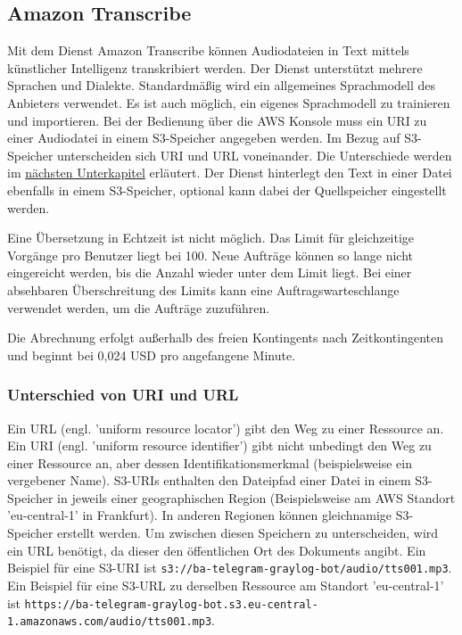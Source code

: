 \subsection{Amazon Transcribe}
\label{sec:amazon-transcribe}

Mit dem Dienst Amazon Transcribe können Audiodateien in Text mittels künstlicher Intelligenz transkribiert werden. Der Dienst unterstützt mehrere Sprachen und Dialekte. Standardmäßig wird ein allgemeines Sprachmodell des Anbieters verwendet. Es ist auch möglich, ein eigenes Sprachmodell zu trainieren und importieren. Bei der Bedienung über die AWS Konsole muss ein URI zu einer Audiodatei in einem S3-Speicher angegeben werden. Im Bezug auf S3-Speicher unterscheiden sich URI und URL voneinander. Die Unterschiede werden im \hyperref[sec:unterschied-uri-url]{nächsten Unterkapitel} erläutert. Der Dienst hinterlegt den Text in einer Datei ebenfalls in einem S3-Speicher, optional kann dabei der Quellspeicher eingestellt werden. 

Eine Übersetzung in Echtzeit ist nicht möglich. Das Limit für gleichzeitige Vorgänge pro Benutzer liegt bei 100. Neue Aufträge können so lange nicht eingereicht werden, bis die Anzahl wieder unter dem Limit liegt. Bei einer absehbaren Überschreitung des Limits kann eine Auftragswarteschlange verwendet werden, um die Aufträge zuzuführen. 

Die Abrechnung erfolgt außerhalb des freien Kontingents nach Zeitkontingenten und beginnt bei 0,024 USD pro angefangene Minute.

\subsubsection{Unterschied von URI und URL}
\label{sec:unterschied-uri-url}

Ein URL (engl. 'uniform resource locator') gibt den Weg zu einer Ressource an. Ein URI (engl. 'uniform resource identifier') gibt nicht unbedingt den Weg zu einer Ressource an, aber dessen Identifikationsmerkmal (beispielsweise ein vergebener Name). S3-URIs enthalten den Dateipfad einer Datei in einem S3-Speicher in jeweils einer geographischen Region (Beispielsweise am AWS Standort 'eu-central-1' in Frankfurt). In anderen Regionen können gleichnamige S3-Speicher erstellt werden. Um zwischen diesen Speichern zu unterscheiden, wird ein URL benötigt, da dieser den öffentlichen Ort des Dokuments angibt. Ein Beispiel für eine S3-URI ist \lstinline{s3://ba-telegram-graylog-bot/audio/tts001.mp3}. Ein Beispiel für eine S3-URL zu derselben Ressource am Standort 'eu-central-1' ist \lstinline{https://ba-telegram-graylog-bot.s3.eu-central-1.amazonaws.com/audio/tts001.mp3}. 

